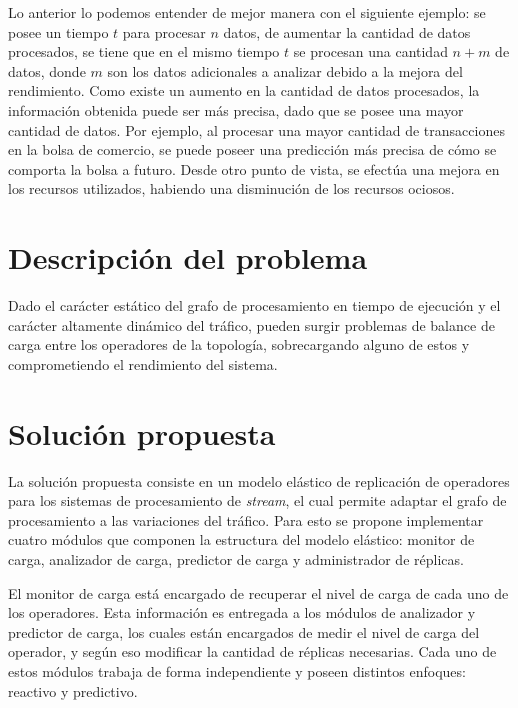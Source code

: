 Lo anterior lo podemos entender de mejor manera con el siguiente ejemplo: se posee un tiempo $t$ para procesar $n$ datos, de aumentar la cantidad de datos procesados, se tiene que en el mismo tiempo $t$ se procesan una cantidad $n+m$ de datos, donde $m$ son los datos adicionales a analizar debido a la mejora del rendimiento. Como existe un aumento en la cantidad de datos procesados, la información obtenida puede ser más precisa, dado que se posee una mayor cantidad de datos. Por ejemplo, al procesar una mayor cantidad de transacciones en la bolsa de comercio, se puede poseer una predicción más precisa de cómo se comporta la bolsa a futuro. Desde otro punto de vista, se efectúa una mejora en los recursos utilizados, habiendo una disminución de los recursos ociosos.

\section{Descripción del problema}
\label{intro:problema}


Dado el carácter estático del grafo de procesamiento en tiempo de ejecución y el carácter altamente dinámico del tráfico, pueden surgir problemas de balance de carga entre los operadores de la topología, sobrecargando alguno de estos y comprometiendo el rendimiento del sistema.

\section{Solución propuesta}
\label{intro:solucion}

La solución propuesta consiste en un modelo elástico de replicación de operadores para los sistemas de procesamiento de \textit{stream}, el cual permite adaptar el grafo de procesamiento a las variaciones del tráfico. Para esto se propone implementar cuatro módulos que componen la estructura del modelo elástico: monitor de carga, analizador de carga, predictor de carga y administrador de réplicas.

El monitor de carga está encargado de recuperar el nivel de carga de cada uno de los operadores. Esta información es entregada a los módulos de analizador y predictor de carga, los cuales están encargados de medir el nivel de carga del operador, y según eso modificar la cantidad de réplicas necesarias. Cada uno de estos módulos trabaja de forma independiente y poseen distintos enfoques: reactivo y predictivo.

